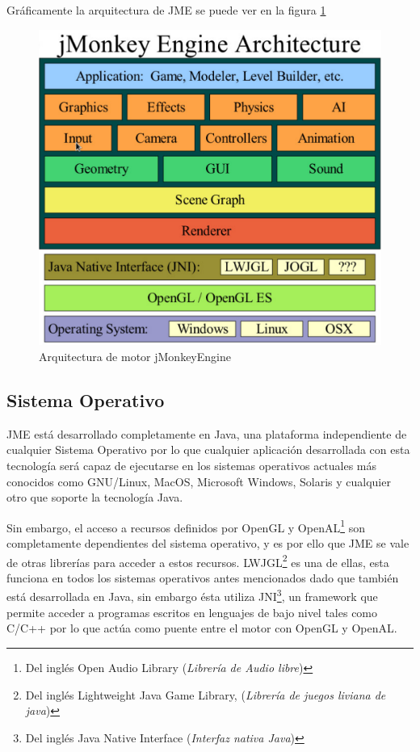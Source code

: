 \documentclass[a4paper,12pt,openany,oneside]{book}
\begin{document}
Gráficamente la arquitectura de JME se puede ver en la figura \ref{archjme}
\begin{figure}[!hbp]
\begin{center}
\includegraphics[scale=0.6]{arquitectura.pdf}
\caption{Arquitectura de motor jMonkeyEngine}
\label{archjme}
\end{center}
\end{figure}
\subsection{Sistema Operativo}
JME está desarrollado completamente en Java, una plataforma independiente de cualquier Sistema Operativo por lo que cualquier aplicación desarrollada con esta tecnología será capaz de ejecutarse en los sistemas operativos actuales más conocidos como GNU/Linux, MacOS, Microsoft Windows, Solaris y cualquier otro que soporte la tecnología Java. 

Sin embargo, el acceso a recursos definidos por OpenGL y OpenAL\footnote{Del inglés Open Audio Library (\textit{Librería de Audio libre})} son completamente dependientes del sistema operativo, y es por ello que JME se vale de otras librerías para acceder a estos recursos. LWJGL\footnote{Del inglés Lightweight Java Game Library, (\textit{Librería de juegos liviana de java})} es una de ellas, esta funciona en todos los sistemas operativos antes mencionados dado que también está desarrollada en Java, sin embargo ésta utiliza JNI\footnote{Del inglés Java Native Interface (\textit{Interfaz nativa Java})}, un framework que permite acceder a programas escritos en lenguajes de bajo nivel tales como C/C++ por lo que actúa como puente entre el motor con OpenGL y OpenAL.
\end{document}
